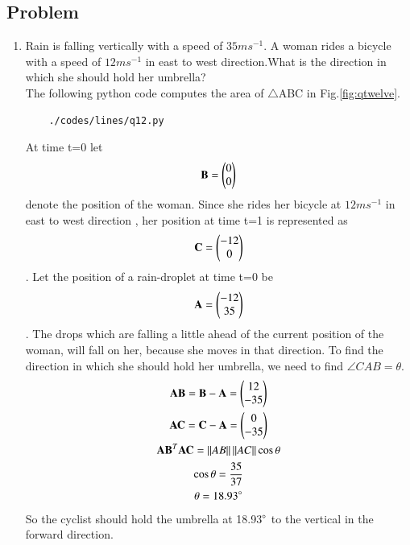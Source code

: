 \subsection{Problem}

\renewcommand{\theequation}{\theenumi}
\begin{enumerate}[label=\thesection.\arabic*.,ref=\thesection.\theenumi]
	\item Rain is falling vertically with a speed of $35ms^{-1}$. A woman rides a bicycle with a speed of $12ms^{-1}$ in east to west direction.What is the direction in which she should hold her umbrella?\\
The following python code computes the area of $\triangle$ABC in Fig.\ref{fig:qtwelve}.
	\begin{lstlisting}
	./codes/lines/q12.py
	\end{lstlisting}
	
	\solution At time t=0 let
\begin{align}
\mathbf{B} = \begin{pmatrix}0\\0\end{pmatrix}
\end{align}
 denote the position of the woman. Since she rides her bicycle at $12ms^{-1}$ in east to west direction , her position at time t=1 is represented as 
\begin{align}
\mathbf{C} = \begin{pmatrix}-12\\0\end{pmatrix}
\end{align}
. Let the position of a rain-droplet at time t=0 be 
\begin{align}
\mathbf{A} = \begin{pmatrix}-12\\35\end{pmatrix}
\end{align}
. The drops which are falling a little ahead of the current position of the woman, will fall on her, because she moves in that direction.
To find the direction in which she should hold her umbrella, we need to find $\angle{CAB} =\theta$. 
\begin{multline}  
	\mathbf{AB = B-A} = \begin{pmatrix}12\\-35\end{pmatrix}
	\\
	\mathbf{AC = C-A} = \begin{pmatrix}0\\-35\end{pmatrix}
	\\
	\mathbf{AB}^T\mathbf{AC} = \left\lVert AB\right\rVert\left\lVert AC\right\rVert\cos{\theta}
	\\
	\cos{\theta} = \frac{35}{37}
	\\
	\theta = 18.93\degree 
\end{multline}
So the cyclist should hold the umbrella at 18.93$\degree$ to the vertical in the forward direction.


\end{enumerate}
